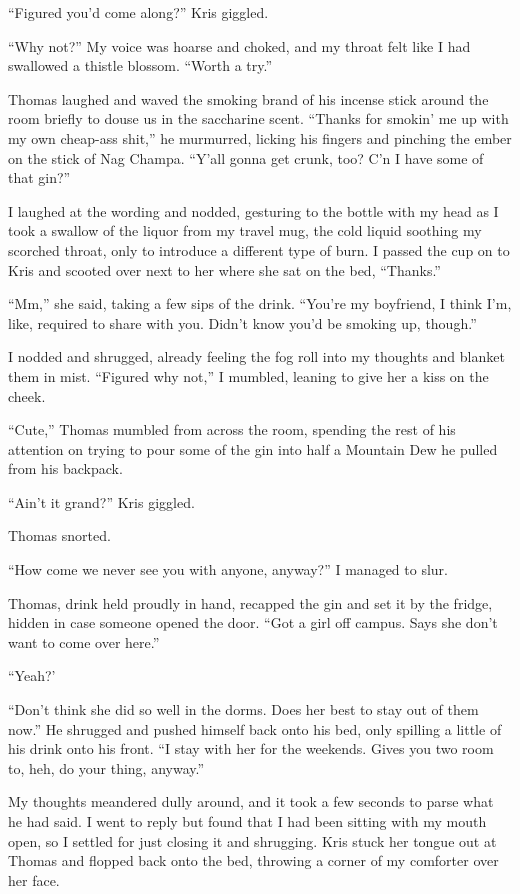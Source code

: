 ``Figured you'd come along?'' Kris giggled.

``Why not?''  My voice was hoarse and choked, and my throat felt like I had swallowed a thistle blossom.  ``Worth a try.''

Thomas laughed and waved the smoking brand of his incense stick around the room briefly to douse us in the saccharine scent.  ``Thanks for smokin' me up with my own cheap-ass shit,'' he murmurred, licking his fingers and pinching the ember on the stick of Nag Champa.  ``Y'all gonna get crunk, too?  C'n I have some of that gin?''

I laughed at the wording and nodded, gesturing to the bottle with my head as I took a swallow of the liquor from my travel mug, the cold liquid soothing my scorched throat, only to introduce a different type of burn.  I passed the cup on to Kris and scooted over next to her where she sat on the bed, ``Thanks.''

``Mm,'' she said, taking a few sips of the drink.  ``You're my boyfriend, I think I'm, like, required to share with you.  Didn't know you'd be smoking up, though.''

I nodded and shrugged, already feeling the fog roll into my thoughts and blanket them in mist.  ``Figured why not,'' I mumbled, leaning to give her a kiss on the cheek.

``Cute,'' Thomas mumbled from across the room, spending the rest of his attention on trying to pour some of the gin into half a Mountain Dew he pulled from his backpack.

``Ain't it grand?'' Kris giggled.

Thomas snorted.

``How come we never see you with anyone, anyway?'' I managed to slur.

Thomas, drink held proudly in hand, recapped the gin and set it by the fridge, hidden in case someone opened the door.  ``Got a girl off campus.  Says she don't want to come over here.''

``Yeah?'

``Don't think she did so well in the dorms.  Does her best to stay out of them now.''  He shrugged and pushed himself back onto his bed, only spilling a little of his drink onto his front.  ``I stay with her for the weekends.  Gives you two room to, heh, do your thing, anyway.''

My thoughts meandered dully around, and it took a few seconds to parse what he had said.  I went to reply but found that I had been sitting with my mouth open, so I settled for just closing it and shrugging.  Kris stuck her tongue out at Thomas and flopped back onto the bed, throwing a corner of my comforter over her face.

